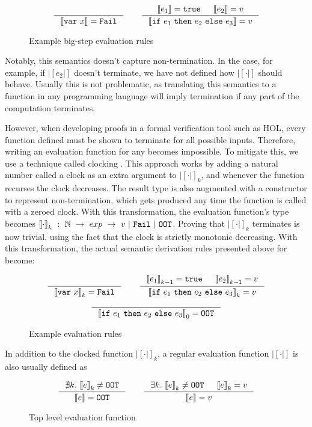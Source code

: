 \begin{figure}[h]
  \[
    \inference{}{|[\lit{var}\ x|] = \lit{Fail}}\qquad
    \inference
    { |[e_1|] = \lit{true} & |[e_2|] = v}
    { |[\lit{if}\ e_1\ \lit{then}\ e_2\ \lit{else}\ e_3|] = v }
  \]
  \caption{Example big-step evaluation rules}
\end{figure}

Notably, this semantics doesn't capture non-termination. In the
 case, for example, if $|[e_2|]$ doesn't terminate, we have
not defined how $|[\cdot|]$ should behave. Usually this is not problematic, as
translating this semantics to a function in any programming language will imply
termination if any part of the computation terminates.

However, when developing proofs in a formal verification tool such as HOL, every
function defined must be shown to terminate for all possible inputs. Therefore,
writing an evaluation function for any becomes impossible. To mitigate this, we
use a technique called clocking \cite{owens2016functional}. This approach works
by adding a natural number called a clock as an extra argument to $|[\cdot|]_k$,
and whenever the function recurses the clock decreases. The result type is also
augmented with a constructor to represent non-termination, which gets produced
any time the function is called with a zeroed clock. With this transformation,
the evaluation function's type becomes $|[\cdot|]_k\ :\ \mathbb{N}\ \to\  exp\
\to\ v\ |\ \texttt{Fail}\ |\ \texttt{OOT}$. Proving that $|[\cdot|]_k$ terminates is
now trivial, using the fact that the clock is strictly monotonic decreasing.
With this transformation, the actual semantic derivation rules presented above
for \ThunkLang{} become:

\begin{figure}[h]
  \[
    \inference{}{|[\lit{var}\ x|]_k = \lit{Fail}}\qquad
    \inference
    { |[e_1|]_{k-1} = \lit{true} & |[e_2|]_{k-1} = v }
    { |[\lit{if}\ e_1\ \lit{then}\ e_2\ \lit{else}\ e_3|]_k = v }
  \]
  \[
    \inference
    {}
    { |[\lit{if}\ e_1\ \lit{then}\ e_2\ \lit{else}\ e_3|]_0 = \lit{OOT} }
  \]
  \caption{Example \ThunkLang{} evaluation rules}
\end{figure}

In addition to the clocked function $|[\cdot|]_k$, a regular evaluation function
$|[\cdot|]$ is also usually defined as

\begin{figure}[h]
  \[
    \inference{\nexists k.\ |[e|]_k \neq \lit{OOT}}
    {|[e|] = \lit{OOT}}\qquad
    \inference
    { \exists k.\ |[e|]_k \neq \lit{OOT} & |[e|]_k = v }
    { |[e|] = v }
  \]
  \caption{Top level \ThunkLang{} evaluation function}
\end{figure}


